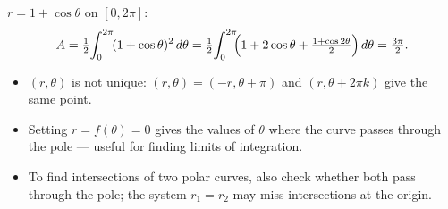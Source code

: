 \begin{example}
$r = 1 + \cos\theta$ on $[0, 2\pi]$:
\[ A = \tfrac{1}{2}\!\int_0^{2\pi}\! (1 + \cos\theta)^2 \,d\theta
= \tfrac{1}{2}\!\int_0^{2\pi}\! \!\Bigl(1 + 2\cos\theta + \tfrac{1 + \cos 2\theta}{2}\Bigr) \,d\theta
= \tfrac{3\pi}{2}. \]
\end{example}

\begin{pitfallbox}
\begin{itemize}[leftmargin=*,nosep]
  \item $(r, \theta)$ is not unique: $(r, \theta) = (-r, \theta + \pi)$ and $(r, \theta + 2\pi k)$
        give the same point.
  \item Setting $r = f(\theta) = 0$ gives the values of $\theta$ where the curve passes through
        the pole --- useful for finding limits of integration.
  \item To find intersections of two polar curves, also check whether both pass through the pole;
        the system $r_1 = r_2$ may miss intersections at the origin.
\end{itemize}
\end{pitfallbox}
